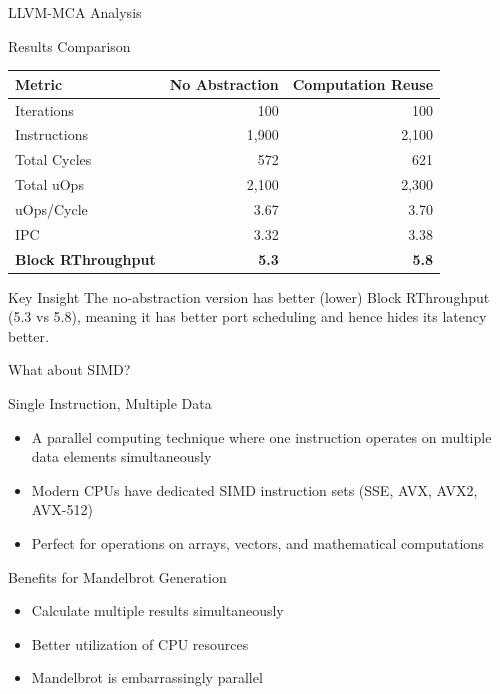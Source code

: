 \documentclass{beamer}
\begin{document}
\begin{frame}{LLVM-MCA Analysis}    
    \begin{block}{Results Comparison}
        \begin{tabular}{lrr}
            \textbf{Metric} & \textbf{No Abstraction} & \textbf{Computation Reuse} \\
            \hline
            Iterations & 100 & 100 \\
            Instructions & 1,900 & 2,100 \\
            Total Cycles & 572 & 621 \\
            Total uOps & 2,100 & 2,300 \\
            \hline
            uOps/Cycle & 3.67 & 3.70 \\
            IPC & 3.32 & 3.38 \\
            \textbf{Block RThroughput} & \textbf{5.3} & \textbf{5.8} \\
        \end{tabular}
    \end{block}
    
    \begin{alertblock}{Key Insight}
        The no-abstraction version has better (lower) Block RThroughput (5.3 vs 5.8), meaning it has better port scheduling and hence hides its latency better.
    \end{alertblock}
\end{frame}


\begin{frame}{What about SIMD?}
    \begin{block}{Single Instruction, Multiple Data}
        \begin{itemize}
            \item A parallel computing technique where one instruction operates on multiple data elements simultaneously
            \item Modern CPUs have dedicated SIMD instruction sets (SSE, AVX, AVX2, AVX-512)
            \item Perfect for operations on arrays, vectors, and mathematical computations
        \end{itemize}
    \end{block}
    
    \begin{block}{Benefits for Mandelbrot Generation}
        \begin{itemize}
            \item Calculate multiple results simultaneously
            \item Better utilization of CPU resources
            \item Mandelbrot is embarrassingly parallel
        \end{itemize}
    \end{block}
\end{frame}
\end{document}
